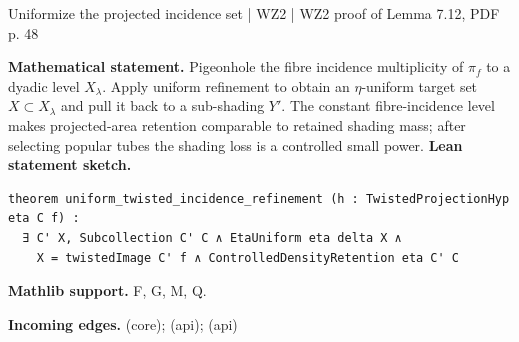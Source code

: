 \documentclass[10pt,a4paper]{article}
\newcommand{\nodecard}[1]{\hyperlink{node-#1}{\texttt{\detokenize{#1}}}}
\begin{document}
\begin{minipage}{\linewidth}
\hypertarget{node-W2ImageUniform}{}
\begin{tcolorbox}[colback=white,colframe=cinematicfg,colbacktitle=cinematicbg,coltitle=ink,boxrule=0.45pt,arc=1.6mm,left=3mm,right=3mm,top=2mm,bottom=2mm,title={\sffamily\bfseries WZ2 Lemma 7.12: preparation \hfill \texttt{W2ImageUniform}}]
{\sffamily\small\color{muted}Uniformize the projected incidence set | WZ2 | WZ2 proof of Lemma 7.12, PDF p. 48}\par
\textbf{Mathematical statement.} Pigeonhole the fibre incidence multiplicity of $\pi_f$ to a dyadic level $X_\lambda$.
Apply uniform refinement to obtain an $\eta$-uniform target set $X\subset X_\lambda$ and pull it back to a sub-shading $Y'$.
The constant fibre-incidence level makes projected-area retention comparable to retained shading mass; after selecting popular tubes the shading loss is a controlled small power.
\smallskip\textbf{Lean statement sketch.}
\begin{Verbatim}[fontsize=\small,breaklines=true,breakanywhere=true,tabsize=2]
theorem uniform_twisted_incidence_refinement (h : TwistedProjectionHyp eta C f) :
  ∃ C' X, Subcollection C' C ∧ EtaUniform eta delta X ∧
    X = twistedImage C' f ∧ ControlledDensityRetention eta C' C
\end{Verbatim}
{\footnotesize\textbf{Mathlib support.} F, G, M, Q.\par
\textbf{Incoming edges.} \nodecard{W2L7_9} (core); \nodecard{Dtwist} (api); \nodecard{Imass} (api)\par}

\end{tcolorbox}\end{minipage}\par\medskip
\end{document}
